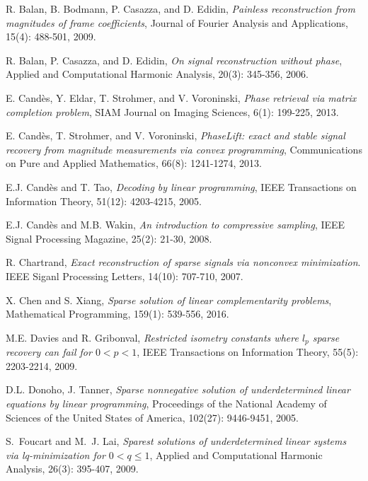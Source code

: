 \documentclass[12pt]{article}
\begin{document}
%
%
\begin{thebibliography}{abc99xyz}
 R. Balan, B. Bodmann, P. Casazza, and D. Edidin, \emph{Painless reconstruction from magnitudes of frame coefficients}, Journal of Fourier Analysis and Applications, 15(4): 488-501, 2009.

 R. Balan, P. Casazza, and D. Edidin, \emph{On signal reconstruction without phase}, Applied and Computational Harmonic Analysis, 20(3): 345-356, 2006.

E. Cand\`es, Y. Eldar, T. Strohmer, and V. Voroninski, \emph{Phase retrieval via matrix completion problem}, SIAM Journal on Imaging Sciences, 6(1): 199-225, 2013.

E. Cand\`es, T. Strohmer, and V. Voroninski, \emph{PhaseLift: exact and stable signal recovery from magnitude measurements via convex programming}, Communications on Pure and Applied Mathematics, 66(8): 1241-1274, 2013.

E.J. Cand\`es and T. Tao, \emph{Decoding by linear programming},  IEEE Transactions on Information Theory, 51(12): 4203-4215, 2005.

E.J. Cand\`es and M.B. Wakin,  \emph{An introduction to compressive sampling}, IEEE Signal Processing Magazine, 25(2): 21-30, 2008.

 R. Chartrand, \emph{Exact reconstruction of sparse signals via nonconvex minimization}. IEEE Siganl Processing Letters, 14(10): 707-710, 2007.

X. Chen and S. Xiang, \emph{Sparse solution of linear complementarity problems}, Mathematical Programming, 159(1): 539-556, 2016.

M.E. Davies and R. Gribonval, \emph{Restricted isometry constants where $l_p$ sparse recovery can fail for $0 < p < 1$}, IEEE Transactions on Information Theory, 55(5): 2203-2214, 2009.

D.L. Donoho, J. Tanner, \emph{Sparse nonnegative solution of underdetermined linear equations by linear programming}, Proceedings of the National Academy of Sciences of the United States of America, 102(27): 9446-9451, 2005.

S.~Foucart and M.~J. Lai, \emph{Sparest solutions of underdetermined linear systems via lq-minimization for $0 < q\leqslant 1$}, Applied and Computational Harmonic Analysis, 26(3): 395-407, 2009.


\end{thebibliography}
\end{document}
